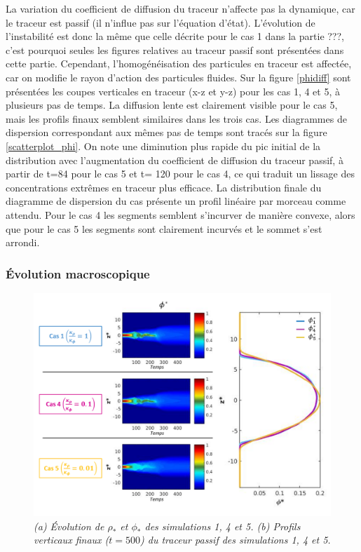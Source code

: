 \documentclass[a4paper,12pt]{article}
\begin{document}
    La variation du coefficient de diffusion du traceur n'affecte pas la dynamique, car le traceur est passif (il n'influe pas sur l'équation d'état). L'évolution de l'instabilité est donc la même que celle décrite pour le cas 1 dans la partie ???, c'est pourquoi seules les figures relatives au traceur passif sont présentées dans cette partie. Cependant, l'homogénéisation des particules en traceur est affectée, car on modifie le rayon d'action des particules fluides. Sur la figure \ref{phidiff} sont présentées les coupes verticales en traceur (x-z et y-z) pour les cas 1, 4 et 5, à plusieurs pas de temps. La diffusion lente est clairement visible pour le cas 5, mais les profils finaux semblent similaires dans les trois cas. Les diagrammes de dispersion correspondant aux mêmes pas de temps sont tracés sur la figure \ref{scatterplot_phi}. On note une diminution plus rapide du pic initial de la distribution avec l'augmentation du coefficient de diffusion du traceur passif, à partir de t=84 pour le cas 5 et t= 120 pour le cas 4, ce qui traduit un lissage des concentrations extrêmes en traceur plus efficace. La distribution finale du diagramme de dispersion du cas présente un profil linéaire par morceau comme attendu. Pour le cas 4 les segments semblent s'incurver de manière convexe, alors que pour le cas 5 les segments sont clairement incurvés et le sommet s'est arrondi.
    
    \subsubsection{Évolution macroscopique}
    
    \begin{figure}[!h]
        \centering
        \includegraphics[width=1\linewidth]{figures/phidiff_star.png}
        \caption{\textit{(a) Évolution de $\rho_*$ et $\phi_*$ des simulations 1, 4 et 5. (b) Profils verticaux finaux ($t=500$) du traceur passif des simulations 1, 4 et 5.}}
        \label{phidiff_star}
    \end{figure}
    
\end{document}
